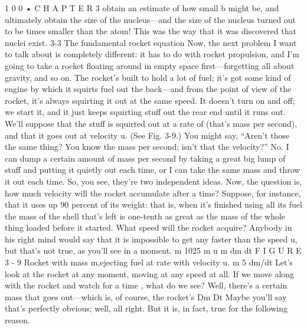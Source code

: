 \documentclass[10pt,oneside]{article}
\begin{document}
1 0 0 • C H A P T E R  3 obtain an estimate of how small b might be, and ultimately obtain the size of the nucleus---and the size of the nucleus turned out to be times smaller than the atom! This was the way that it was discovered that nuclei exist. 3-3 The fundamental rocket equation Now, the next problem I want to talk about is completely different: it has to do with rocket propulsion, and I’m going to take a rocket floating around in empty space first---forgetting all about gravity, and so on. The rocket’s built to hold a lot of fuel; it’s got some kind of engine by which it squirts fuel out the back---and from the point of view of the rocket, it’s always squirting it out at the same speed. It doesn’t turn on and off; we start it, and it just keeps squirting stuff out the rear end until it runs out. We’ll suppose that the stuff is squirted out at a rate of (that’s mass per second), and that it goes out at velocity u. (See Fig. 3-9.) You might say, “Aren’t those the same thing? You know the mass per second; isn’t that the velocity?” No. I can dump a certain amount of mass per second by taking a great big lump of stuff and putting it quietly out each time, or I can take the same mass and throw it out each time. So, you see, they’re two independent ideas. Now, the question is, how much velocity will the rocket accumulate after a time? Suppose, for instance, that it uses up 90 percent of its weight: that is, when it’s finished using all its fuel the mass of the shell that’s left is one-tenth as great as the mass of the whole thing loaded before it started. What speed will the rocket acquire? Anybody in his right mind would say that it is impossible to get any faster than the speed u, but that’s not true, as you’ll see in a moment. m 1025 m u m   dm dt F I G U R E 3 - 9 Rocket with mass m,ejecting fuel at rate with velocity u. m 5 dm/dt Let’s look at the rocket at any moment, moving at any speed at all. If we move along with the rocket and watch for a time , what do we see? Well, there’s a certain mass that goes out---which is, of course, the rocket’s Dm Dt Maybe you’ll say that’s perfectly obvious; well, all right. But it is, in fact, true for the following reason.\par
\end{document}
